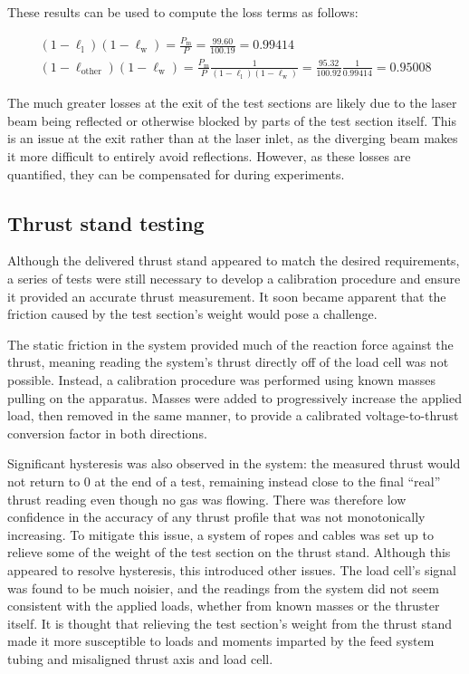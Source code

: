                 These results can be used to compute the loss terms as follows:

                \begin{gather*}
                    (1-\ell_\mathrm{l})(1-\ell_\mathrm{w}) = \frac{P_\mathrm{m}}{P} = \frac{99.60}{100.19} = 0.99414 \\
                    (1-\ell_\mathrm{other})(1-\ell_\mathrm{w}) = \frac{P_\mathrm{m}}{P}\frac{1}{(1-\ell_\mathrm{l})(1-\ell_\mathrm{w})} = \frac{95.32}{100.92}\frac{1}{0.99414} = 0.95008
                \end{gather*}
                
                The much greater losses at the exit of the test sections are likely due to the laser beam being reflected or otherwise blocked by parts of the test section itself. This is an issue at the exit rather than at the laser inlet, as the diverging beam makes it more difficult to entirely avoid reflections. However, as these losses are quantified, they can be compensated for during experiments.

        \subsection{Thrust stand testing}
                Although the delivered thrust stand appeared to match the desired requirements, a series of tests were still necessary to develop a calibration procedure and ensure it provided an accurate thrust measurement. It soon became apparent that the friction caused by the test section's weight would pose a challenge.
                
                The static friction in the system provided much of the reaction force against the thrust, meaning reading the system's thrust directly off of the load cell was not possible. Instead, a calibration procedure was performed using known masses pulling on the apparatus. Masses were added to progressively increase the applied load, then removed in the same manner, to provide a calibrated voltage-to-thrust conversion factor in both directions.
                
                Significant hysteresis was also observed in the system: the measured thrust would not return to 0 at the end of a test, remaining instead close to the final ``real'' thrust reading even though no gas was flowing. There was therefore low confidence in the accuracy of any thrust profile that was not monotonically increasing. To mitigate this issue, a system of ropes and cables was set up to relieve some of the weight of the test section on the thrust stand. Although this appeared to resolve hysteresis, this introduced other issues. The load cell's signal was found to be much noisier, and the readings from the system did not seem consistent with the applied loads, whether from known masses or the thruster itself. It is thought that relieving the test section's weight from the thrust stand made it more susceptible to loads and moments imparted by the feed system tubing and misaligned thrust axis and load cell.

